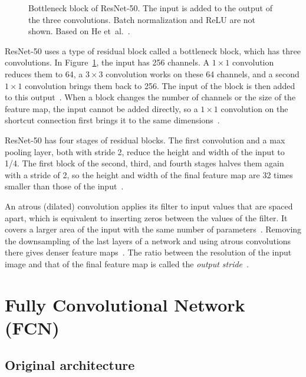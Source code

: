 \begin{figure}[H]
  \centering
  \caption{Bottleneck block of ResNet-50. The input is added to the output of the three convolutions. Batch normalization and ReLU are not shown. Based on He et~al.~\cite{he2016deep}.}
  \label{fig:bottleneck}
\end{figure}

ResNet-50 uses a type of residual block called a bottleneck block, which has three convolutions. In Figure~\ref{fig:bottleneck}, the input has 256 channels. A $1\times1$ convolution reduces them to 64, a $3\times3$ convolution works on these 64 channels, and a second $1\times1$ convolution brings them back to 256. The input of the block is then added to this output~\cite{he2016deep}. When a block changes the number of channels or the size of the feature map, the input cannot be added directly, so a $1\times1$ convolution on the shortcut connection first brings it to the same dimensions~\cite{he2016deep}.

ResNet-50 has four stages of residual blocks. The first convolution and a max pooling layer, both with stride 2, reduce the height and width of the input to 1/4. The first block of the second, third, and fourth stages halves them again with a stride of 2, so the height and width of the final feature map are 32 times smaller than those of the input~\cite{he2016deep}.

An atrous (dilated) convolution applies its filter to input values that are spaced apart, which is equivalent to inserting zeros between the values of the filter. It covers a larger area of the input with the same number of parameters~\cite{geron2026handson,chen2017deeplab}. Removing the downsampling of the last layers of a network and using atrous convolutions there gives denser feature maps~\cite{chen2017deeplab}. The ratio between the resolution of the input image and that of the final feature map is called the \textit{output stride}~\cite{chen2017deeplab}.

\section{Fully Convolutional Network (FCN)}
\label{sec:fcn_arch}

\subsection{Original architecture}
\label{subsec:fcn_original}

